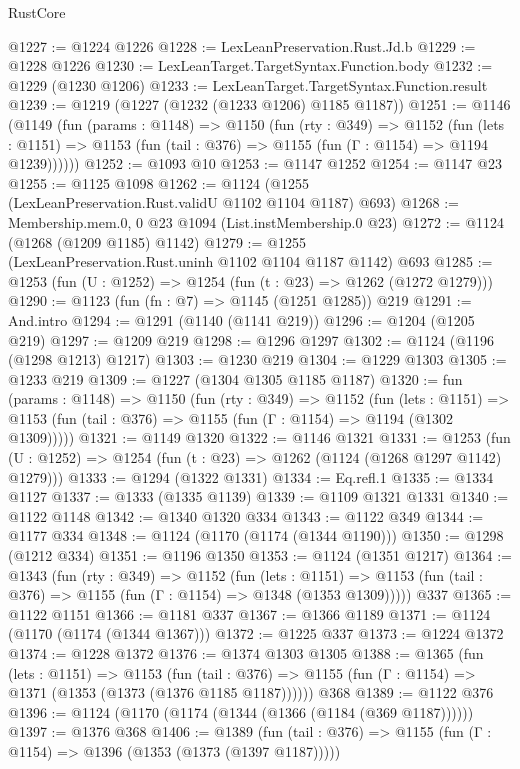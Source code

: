 \begin{lexlean}{RustCore}
\begin{coremodule}
@1227 := @1224 @1226
@1228 := LexLeanPreservation.Rust.Jd.b
@1229 := @1228 @1226
@1230 := LexLeanTarget.TargetSyntax.Function.body
@1232 := @1229 (@1230 @1206)
@1233 := LexLeanTarget.TargetSyntax.Function.result
@1239 := @1219 (@1227 (@1232 (@1233 @1206) @1185 @1187))
@1251 := @1146
    (@1149
      (fun (params : @1148) =>
      @1150
        (fun (rty : @349) =>
        @1152
          (fun (lets : @1151) =>
          @1153 (fun (tail : @376) => @1155 (fun (Γ : @1154) => @1194 @1239))))))
@1252 := @1093 @10
@1253 := @1147 @1252
@1254 := @1147 @23
@1255 := @1125 @1098
@1262 := @1124 (@1255 (LexLeanPreservation.Rust.validU @1102 @1104 @1187) @693)
@1268 := Membership.mem.{0, 0} @23 @1094 (List.instMembership.{0} @23)
@1272 := @1124 (@1268 (@1209 @1185) @1142)
@1279 := @1255 (LexLeanPreservation.Rust.uninh @1102 @1104 @1187 @1142) @693
@1285 := @1253 (fun (U : @1252) => @1254 (fun (t : @23) => @1262 (@1272 @1279)))
@1290 := @1123 (fun (fn : @7) => @1145 (@1251 @1285)) @219
@1291 := And.intro
@1294 := @1291 (@1140 (@1141 @219))
@1296 := @1204 (@1205 @219)
@1297 := @1209 @219
@1298 := @1296 @1297
@1302 := @1124 (@1196 (@1298 @1213) @1217)
@1303 := @1230 @219
@1304 := @1229 @1303
@1305 := @1233 @219
@1309 := @1227 (@1304 @1305 @1185 @1187)
@1320 := fun (params : @1148) =>
  @1150
    (fun (rty : @349) =>
    @1152
      (fun (lets : @1151) =>
      @1153 (fun (tail : @376) => @1155 (fun (Γ : @1154) => @1194 (@1302 @1309)))))
@1321 := @1149 @1320
@1322 := @1146 @1321
@1331 := @1253 (fun (U : @1252) => @1254 (fun (t : @23) => @1262 (@1124 (@1268 @1297 @1142) @1279)))
@1333 := @1294 (@1322 @1331)
@1334 := Eq.refl.{1}
@1335 := @1334 @1127
@1337 := @1333 (@1335 @1139)
@1339 := @1109 @1321 @1331
@1340 := @1122 @1148
@1342 := @1340 @1320 @334
@1343 := @1122 @349
@1344 := @1177 @334
@1348 := @1124 (@1170 (@1174 (@1344 @1190)))
@1350 := @1298 (@1212 @334)
@1351 := @1196 @1350
@1353 := @1124 (@1351 @1217)
@1364 := @1343
    (fun (rty : @349) =>
    @1152
      (fun (lets : @1151) =>
      @1153 (fun (tail : @376) => @1155 (fun (Γ : @1154) => @1348 (@1353 @1309)))))
    @337
@1365 := @1122 @1151
@1366 := @1181 @337
@1367 := @1366 @1189
@1371 := @1124 (@1170 (@1174 (@1344 @1367)))
@1372 := @1225 @337
@1373 := @1224 @1372
@1374 := @1228 @1372
@1376 := @1374 @1303 @1305
@1388 := @1365
    (fun (lets : @1151) =>
    @1153
      (fun (tail : @376) => @1155 (fun (Γ : @1154) => @1371 (@1353 (@1373 (@1376 @1185 @1187))))))
    @368
@1389 := @1122 @376
@1396 := @1124 (@1170 (@1174 (@1344 (@1366 (@1184 (@369 @1187))))))
@1397 := @1376 @368
@1406 := @1389
    (fun (tail : @376) => @1155 (fun (Γ : @1154) => @1396 (@1353 (@1373 (@1397 @1187)))))

\end{coremodule}
\end{lexlean}
